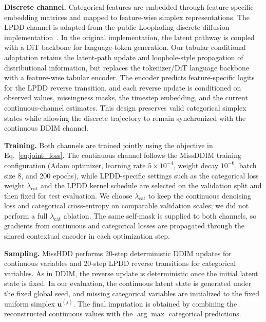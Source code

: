 \documentclass[times, review, 10pt]{elsarticle}
\begin{document}
\textbf{Discrete channel.}
Categorical features are embedded through feature-specific embedding
matrices and mapped to feature-wise simplex representations. The LPDD channel
is adapted from the public Loopholing discrete diffusion implementation~\cite{loopholing}. In the original
implementation, the latent pathway is coupled with a DiT backbone for
language-token generation. Our tabular conditional adaptation retains the
latent-path update and loophole-style propagation of distributional
information, but replaces the tokenizer/DiT language backbone with a
feature-wise tabular encoder. The encoder predicts feature-specific logits for
the LPDD reverse transition, and each reverse update is conditioned on
observed values, missingness masks, the timestep embedding, and the current
continuous-channel estimates. This design preserves valid categorical
simplex states while allowing the discrete trajectory to remain synchronized
with the continuous DDIM channel.

\textbf{Training.}
Both channels are trained jointly using the objective in
Eq.~\eqref{eq:joint_loss}. The continuous channel follows the MissDDIM
training configuration (Adam optimizer, learning rate $5\times10^{-4}$,
weight decay $10^{-6}$, batch size 8, and 200 epochs), while LPDD-specific
settings such as the categorical loss weight $\lambda_{\mathrm{cat}}$ and the
LPDD kernel schedule are selected on the validation split and then fixed for
test evaluation. We choose $\lambda_{\mathrm{cat}}$ to keep the continuous
denoising loss and categorical cross-entropy on comparable validation scales;
we did not perform a full $\lambda_{\mathrm{cat}}$ ablation. The same self-mask
is supplied to both channels, so gradients from continuous and categorical
losses are propagated through the shared contextual encoder in each
optimization step.

\textbf{Sampling.}
MissHDD performs 20-step deterministic DDIM updates for continuous variables
and 20-step LPDD reverse transitions for categorical variables. As in DDIM,
the reverse update is deterministic once the initial latent state is fixed. In
our evaluation, the continuous latent state is generated under the fixed global
seed, and missing categorical variables are initialized to the fixed uniform
simplex $\mathbf{u}^{(j)}$. The final imputation is obtained by combining the
reconstructed continuous values with the $\arg\max$ categorical predictions.
\end{document}
